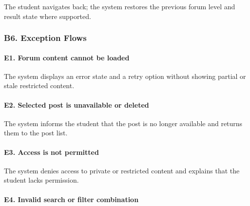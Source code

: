 \documentclass[12pt]{article}
\begin{document}
The student navigates back; the system restores the previous forum level and result state where supported.
\par\medskip

\hypertarget{sec:b6-exception-flows}{}
\subsubsection*{B6. Exception Flows}
\par\medskip

\hypertarget{sec:e1-forum-content-cannot-be-loaded}{}
\paragraph*{E1. Forum content cannot be loaded}
\par\medskip

The system displays an error state and a retry option without showing partial or stale restricted content.
\par\medskip

\hypertarget{sec:e2-selected-post-is-unavailable-or-deleted}{}
\paragraph*{E2. Selected post is unavailable or deleted}
\par\medskip

The system informs the student that the post is no longer available and returns them to the post list.
\par\medskip

\hypertarget{sec:e3-access-is-not-permitted}{}
\paragraph*{E3. Access is not permitted}
\par\medskip

The system denies access to private or restricted content and explains that the student lacks permission.
\par\medskip

\hypertarget{sec:e4-invalid-search-or-filter-combination}{}
\paragraph*{E4. Invalid search or filter combination}
\par\medskip
\end{document}
